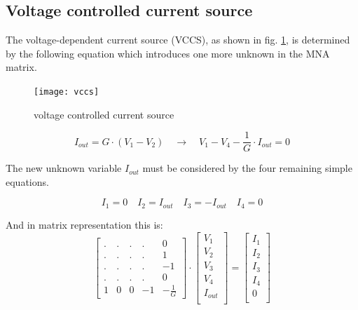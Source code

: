 \subsection{Voltage controlled current source}
\label{sec:vccs}

The voltage-dependent current source (VCCS), as shown in fig.
\ref{fig:vccs}, is determined by the following equation which
introduces one more unknown in the MNA matrix.

\begin{figure}[ht]
\begin{center}
\texttt{[image: vccs]}
\end{center}
\caption{voltage controlled current source}
\label{fig:vccs}
\end{figure}
\FloatBarrier

\begin{equation}
I_{out} = G\cdot\left(V_{1} - V_{2}\right)
\quad \rightarrow \quad
V_{1} - V_{4} - \frac{1}{G}\cdot I_{out} = 0
\label{eq:vccs}
\end{equation}

The new unknown variable $I_{out}$ must be considered by the four
remaining simple equations.

\begin{equation}
I_{1} = 0 \quad I_{2} = I_{out} \quad I_{3} = -I_{out} \quad I_{4} = 0
\end{equation}

And in matrix representation this is:
\begin{equation}
\label{eq:vccsStamp}
\begin{bmatrix}
.&.&.&.& 0\\
.&.&.&.& 1\\
.&.&.&.& -1\\
.&.&.&.& 0\\
1 & 0 & 0 & -1 & -\frac{1}{G}
\end{bmatrix}
\cdot
\begin{bmatrix}
V_{1}\\
V_{2}\\
V_{3}\\
V_{4}\\
I_{out}\\
\end{bmatrix}
=
\begin{bmatrix}
I_{1}\\
I_{2}\\
I_{3}\\
I_{4}\\
0\\
\end{bmatrix}
\end{equation}

